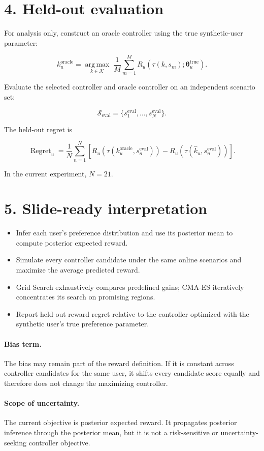 \documentclass[11pt]{article}
\begin{document}
\section*{4. Held-out evaluation}

For analysis only, construct an oracle controller using the true synthetic-user parameter:

\begin{equation}
k_u^{\mathrm{oracle}}
= \underset{k\in\mathcal{K}}{\operatorname{arg\,max}}
\;\frac{1}{M}\sum_{m=1}^{M}
R_u\!\left(\tau(k,s_m);\boldsymbol{\theta}_u^{\mathrm{true}}\right).
\end{equation}

Evaluate the selected controller and oracle controller on an independent scenario set:

\begin{equation}
\mathcal{S}_{\mathrm{eval}}
=\{s_1^{\mathrm{eval}},\ldots,s_N^{\mathrm{eval}}\}.
\end{equation}

The held-out regret is

\begin{equation}
\operatorname{Regret}_u
= \frac{1}{N}\sum_{n=1}^{N}
\left[
R_u\!\left(\tau(k_u^{\mathrm{oracle}},s_n^{\mathrm{eval}})\right)
-R_u\!\left(\tau(\widehat{k}_u,s_n^{\mathrm{eval}})\right)
\right].
\end{equation}

In the current experiment, $N=21$.

\section*{5. Slide-ready interpretation}

\begin{itemize}
    \item Infer each user's preference distribution and use its posterior mean to compute posterior expected reward.
    \item Simulate every controller candidate under the same online scenarios and maximize the average predicted reward.
    \item Grid Search exhaustively compares predefined gains; CMA-ES iteratively concentrates its search on promising regions.
    \item Report held-out reward regret relative to the controller optimized with the synthetic user's true preference parameter.
\end{itemize}

\paragraph{Bias term.}
The bias may remain part of the reward definition. If it is constant across controller candidates for the same user,
it shifts every candidate score equally and therefore does not change the maximizing controller.

\paragraph{Scope of uncertainty.}
The current objective is posterior expected reward. It propagates posterior inference through the posterior mean,
but it is not a risk-sensitive or uncertainty-seeking controller objective.
\end{document}
